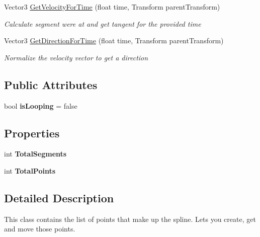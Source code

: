 \begin{DoxyCompactItemize}
Vector3 \mbox{\hyperlink{class_spline_a4dd656d9e96338baa6225ed4d781a943}{Get\+Velocity\+For\+Time}} (float time, Transform parent\+Transform)
\begin{DoxyCompactList}\small\item\em Calculate segment we\textquotesingle{}re at and get tangent for the provided time \end{DoxyCompactList}\item 
Vector3 \mbox{\hyperlink{class_spline_a6747581a7cb4cc9f59eaa751c326c909}{Get\+Direction\+For\+Time}} (float time, Transform parent\+Transform)
\begin{DoxyCompactList}\small\item\em Normalize the velocity vector to get a direction \end{DoxyCompactList}\end{DoxyCompactItemize}
\subsection*{Public Attributes}
\begin{DoxyCompactItemize}
\item 
\mbox{\label{class_spline_ac360272353e20dcba514dd78b9798287}} 
bool {\bfseries is\+Looping} = false
\end{DoxyCompactItemize}
\subsection*{Properties}
\begin{DoxyCompactItemize}
\item 
\mbox{\label{class_spline_a1f1c156071dde8fb73aa30e2f6abe921}} 
int {\bfseries Total\+Segments}
\item 
\mbox{\label{class_spline_a4ff4ecc0ff40ee96b125dc25789b420f}} 
int {\bfseries Total\+Points}
\end{DoxyCompactItemize}


\subsection{Detailed Description}
This class contains the list of points that make up the spline. Lets you create, get and move those points. 



